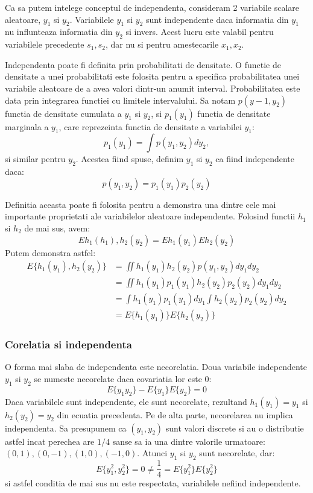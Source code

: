 \documentclass[12pt,oneside]{article}
\begin{document}
Ca sa putem intelege conceptul de independenta, consideram 2 variabile scalare aleatoare, $y_1$ si $y_2$. Variabilele $y_1$ si $y_2$ sunt independente daca informatia din $y_1$ nu influnteaza informatia din $y_2$ si invers. Acest lucru este valabil pentru variabilele precedente $s_1,s_2$, dar nu si pentru amestecarile $x_1,x_2$.

Independenta poate fi definita prin probabilitati de densitate. O functie de densitate a unei probabilitati este folosita pentru a specifica probabilitatea unei variabile aleatoare de a avea valori dintr-un anumit interval. Probabilitatea este data prin integrarea functiei cu limitele intervalului. Sa notam $p(y-1,y_2)$ functia de densitate cumulata a $y_1$ si $y_2$, si $p_1(y_1)$ functia de densitate marginala a $y_1$, care reprezeinta functia de densitate a variabilei $y_1$:
\begin{equation}
p_1(y_1)=\int{p(y_1,y_2)dy_2},
\end{equation}
si similar pentru $y_2$. Acestea fiind spuse, definim $y_1$ si $y_2$ ca fiind independente daca:
\begin{equation}
	p(y_1,y_2)=p_1(y_1)p_2(y_2)
\end{equation}

Definitia aceasta poate fi folosita pentru a demonstra una dintre cele mai importante proprietati ale variabilelor aleatoare independente. Folosind functii $h_1$ si $h_2$ de mai sus, avem:
\begin{equation}
E{h_1(h_1),h_2(y_2)}=E{h_1(y_1)}E{h_2(y_2)}
\end{equation}
Putem demonstra astfel:
\begin{equation}
\begin{split}
E\{h_1(y_1),h_2(y_2)\} & =\iint{h_1(y_1)h_2(y_2)p(y_1,y_2)dy_1dy_2} \\ 
& =\iint{h_1(y_1)p_1(y_1)h_2(y_2)p_2(y_2)dy_1dy_2} \\
& =\int{h_1(y_1)p_1(y_1)dy_1}\int{h_2(y_2)p_2(y_2)dy_2}\\ 
& =E\{h_1(y_1)\}E\{h_2(y_2)\}
\end{split}
\end{equation}

\subsubsection{Corelatia si independenta}
O forma mai slaba de independenta este necorelatia. Doua variabile independente $y_1$ si $y_2$ se numeste necorelate daca covariatia lor este 0:
\begin{equation}
	E\{y_1y_2\}-E\{y_1\}E\{y_2\}=0
\end{equation}
Daca variabilele sunt independente, ele sunt necorelate, rezultand $h_1(y_1)=y_1$ si $h_2(y_2)=y_2$ din ecuatia precedenta.
Pe de alta parte, necorelarea nu implica independenta. Sa presupunem ca $(y_1,y_2)$ sunt valori discrete si au o distributie astfel incat perechea are $1/4$ sanse sa ia una dintre valorile urmatoare: $(0,1),(0,-1),(1,0),(-1,0)$. Atunci $y_1$ si $y_2$ sunt necorelate, dar:
\begin{equation}
E\{y_1^2, y_2^2\}=0 \neq \frac{1}{4} = E\{y_1^2\}E\{y_2^2\}
\end{equation}
si astfel conditia de mai sus nu este respectata, variabilele nefiind independente.
\end{document}
